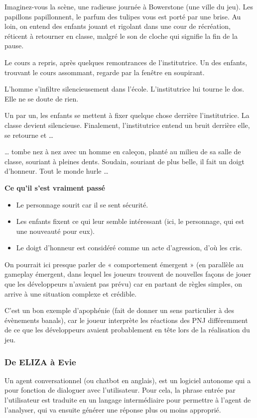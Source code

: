 \documentclass[a4paper, 12pt]{article} %
\begin{document}
Imaginez-vous la scène, une radieuse journée à Bowerstone (une ville du jeu). Les papillons papillonnent, le parfum des tulipes vous est porté par une brise. Au loin, on entend des enfants jouant et rigolant dans une cour de récréation, réticent à retourner en classe, malgré le son de cloche qui signifie la fin de la pause.

Le cours a repris, après quelques remontrances de l’institutrice. Un des enfants, trouvant le cours assommant, regarde par la fenêtre en soupirant.

L’homme s’infiltre silencieusement dans l’école. L’institutrice lui tourne le dos. Elle ne se doute de rien.

Un par un, les enfants se mettent à fixer quelque chose derrière l’institutrice. La classe devient silencieuse. Finalement, l’institutrice entend un bruit derrière elle, se retourne et …

… tombe nez à nez avec un homme en caleçon, planté au milieu de sa salle de classe, souriant à pleines dents. Soudain, souriant de plus belle, il fait un doigt d’honneur. Tout le monde hurle …

\textbf{Ce qu'il s'est vraiment passé}
\begin{itemize}
	\item Le personnage sourit car il se sent sécurité.
	\item Les enfants fixent ce qui leur semble intéressant (ici, le personnage, qui est une nouveauté pour eux).
	\item Le doigt d’honneur est considéré comme un acte d’agression, d’où les cris.
\end{itemize}	

On pourrait ici presque parler de « comportement émergent » (en parallèle au gameplay émergent, dans lequel les joueurs trouvent de nouvelles façons de jouer que les développeurs n’avaient pas prévu) car en partant de règles simples, on arrive à une situation complexe et crédible.

C’est un bon exemple d’apophénie (fait de donner un sens particulier à des évènements banals), car le joueur interprète les réactions des PNJ différemment de ce que les développeurs avaient probablement en tête lors de la réalisation du jeu. 

\newpage
\subsubsection{De ELIZA à Evie}

Un agent conversationnel (ou chatbot en anglais), est un logiciel autonome qui a pour fonction de dialoguer avec l’utilisateur. Pour cela, la phrase entrée par l’utilisateur est traduite en un langage intermédiaire pour permettre à l’agent de l’analyser, qui va ensuite générer une réponse plus ou moins approprié.
\end{document}
